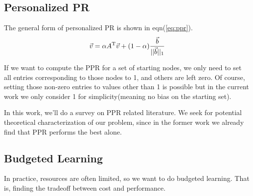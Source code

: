 \documentclass[11pt,a4paper]{article}
\begin{document}
\subsection{Personalized PR}

The general form of personalized PR is shown in eqn(\ref{eq:ppr}). 
\begin{equation}
	\vec{v} = \alpha A^{\rm T}\vec{v}
	+ (1-\alpha)\frac{\vec{b}}{||\vec{b}||_1}
	\label{eq:ppr}
\end{equation}

If we want to compute the PPR for a set of starting nodes, 
we only need to set all entries corresponding to those nodes 
to 1, and others are left zero. Of course, setting those non-zero
entries to values other than 1 is possible but in the current work 
we only consider 1 for simplicity(meaning no bias on the starting 
set). 

In this work, we'll do a survey on PPR related literature.
We seek for potential theoretical characterization of our problem, 
since in the former work we already find that PPR performs the best
alone. 

\subsection{Budgeted Learning}

In practice, resources are often limited, so we want to do 
budgeted learning. That is, finding the tradeoff between 
cost and performance. 
\end{document}
